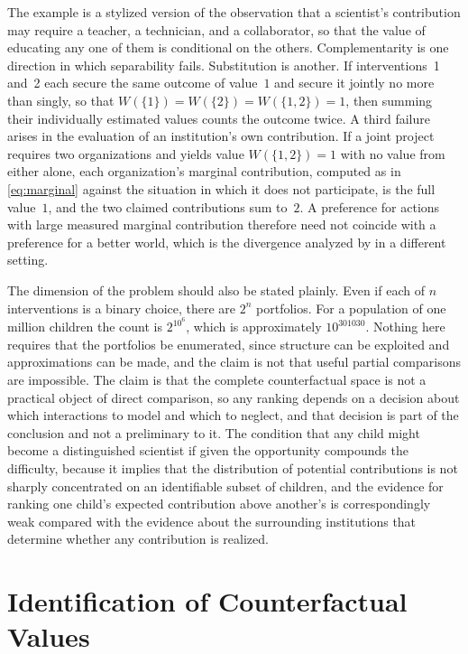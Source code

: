 \documentclass[11pt]{article}
\theoremstyle{definition}
\theoremstyle{remark}
\begin{document}
The example is a stylized version of the observation that a scientist's contribution may require a teacher, a technician, and a collaborator, so that the value of educating any one of them is conditional on the others. Complementarity is one direction in which separability fails. Substitution is another. If interventions~1 and~2 each secure the same outcome of value~$1$ and secure it jointly no more than singly, so that $W(\{1\})=W(\{2\})=W(\{1,2\})=1$, then summing their individually estimated values counts the outcome twice. A third failure arises in the evaluation of an institution's own contribution. If a joint project requires two organizations and yields value $W(\{1,2\})=1$ with no value from either alone, each organization's marginal contribution, computed as in \eqref{eq:marginal} against the situation in which it does not participate, is the full value~$1$, and the two claimed contributions sum to~$2$. A preference for actions with large measured marginal contribution therefore need not coincide with a preference for a better world, which is the divergence analyzed by \citet{greaves2024} in a different setting.

The dimension of the problem should also be stated plainly. Even if each of $n$ interventions is a binary choice, there are $2^{n}$ portfolios. For a population of one million children the count is $2^{10^{6}}$, which is approximately $10^{301030}$. Nothing here requires that the portfolios be enumerated, since structure can be exploited and approximations can be made, and the claim is not that useful partial comparisons are impossible. The claim is that the complete counterfactual space is not a practical object of direct comparison, so any ranking depends on a decision about which interactions to model and which to neglect, and that decision is part of the conclusion and not a preliminary to it. The condition that any child might become a distinguished scientist if given the opportunity compounds the difficulty, because it implies that the distribution of potential contributions is not sharply concentrated on an identifiable subset of children, and the evidence for ranking one child's expected contribution above another's is correspondingly weak compared with the evidence about the surrounding institutions that determine whether any contribution is realized.

\section{Identification of Counterfactual Values}
\label{sec:ident}
\end{document}

